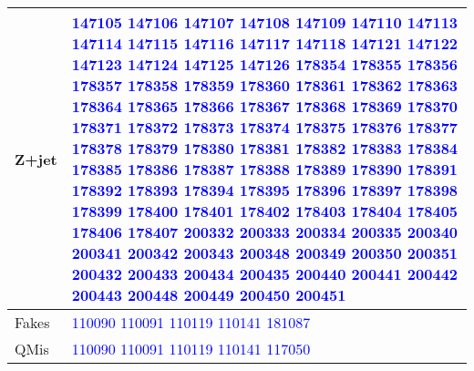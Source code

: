 {\begin{tabular}{|l|p{10cm}|}
Z+jet & \textcolor{blue}{147105} \textcolor{blue}{147106} \textcolor{blue}{147107} \textcolor{blue}{147108} \textcolor{blue}{147109} \textcolor{blue}{147110} \textcolor{blue}{147113} \textcolor{blue}{147114} \textcolor{blue}{147115} \textcolor{blue}{147116} \textcolor{blue}{147117} \textcolor{blue}{147118} \textcolor{blue}{147121} \textcolor{blue}{147122} \textcolor{blue}{147123} \textcolor{blue}{147124} \textcolor{blue}{147125} \textcolor{blue}{147126} \textcolor{blue}{178354} \textcolor{blue}{178355} \textcolor{blue}{178356} \textcolor{blue}{178357} \textcolor{blue}{178358} \textcolor{blue}{178359} \textcolor{blue}{178360} \textcolor{blue}{178361} \textcolor{blue}{178362} \textcolor{blue}{178363} \textcolor{blue}{178364} \textcolor{blue}{178365} \textcolor{blue}{178366} \textcolor{blue}{178367} \textcolor{blue}{178368} \textcolor{blue}{178369} \textcolor{blue}{178370} \textcolor{blue}{178371} \textcolor{blue}{178372} \textcolor{blue}{178373} \textcolor{blue}{178374} \textcolor{blue}{178375} \textcolor{blue}{178376} \textcolor{blue}{178377} \textcolor{blue}{178378} \textcolor{blue}{178379} \textcolor{blue}{178380} \textcolor{blue}{178381} \textcolor{blue}{178382} \textcolor{blue}{178383} \textcolor{blue}{178384} \textcolor{blue}{178385} \textcolor{blue}{178386} \textcolor{blue}{178387} \textcolor{blue}{178388} \textcolor{blue}{178389} \textcolor{blue}{178390} \textcolor{blue}{178391} \textcolor{blue}{178392} \textcolor{blue}{178393} \textcolor{blue}{178394} \textcolor{blue}{178395} \textcolor{blue}{178396} \textcolor{blue}{178397} \textcolor{blue}{178398} \textcolor{blue}{178399} \textcolor{blue}{178400} \textcolor{blue}{178401} \textcolor{blue}{178402} \textcolor{blue}{178403} \textcolor{blue}{178404} \textcolor{blue}{178405} \textcolor{blue}{178406} \textcolor{blue}{178407} \textcolor{blue}{200332} \textcolor{blue}{200333} \textcolor{blue}{200334} \textcolor{blue}{200335} \textcolor{blue}{200340} \textcolor{blue}{200341} \textcolor{blue}{200342} \textcolor{blue}{200343} \textcolor{blue}{200348} \textcolor{blue}{200349} \textcolor{blue}{200350} \textcolor{blue}{200351} \textcolor{blue}{200432} \textcolor{blue}{200433} \textcolor{blue}{200434} \textcolor{blue}{200435} \textcolor{blue}{200440} \textcolor{blue}{200441} \textcolor{blue}{200442} \textcolor{blue}{200443} \textcolor{blue}{200448} \textcolor{blue}{200449} \textcolor{blue}{200450} \textcolor{blue}{200451} \\
\hline
Fakes & \textcolor{blue}{110090} \textcolor{blue}{110091} \textcolor{blue}{110119} \textcolor{blue}{110141} \textcolor{blue}{181087} \\
\hline
QMis & \textcolor{blue}{110090} \textcolor{blue}{110091} \textcolor{blue}{110119} \textcolor{blue}{110141} \textcolor{blue}{117050} \\
\hline
\end{tabular}}
